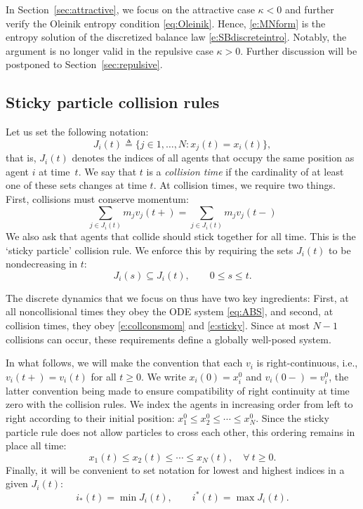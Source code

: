 \documentclass[11pt,reqno]{amsart}
\theoremstyle{definition}
\theoremstyle{remark}
\begin{document}
	In Section~\ref{sec:attractive}, we focus on the attractive case $\kappa<0$ and further verify the Oleinik entropy condition \eqref{eq:Oleinik}. Hence, \eqref{e:MNform} is the entropy solution of the discretized balance law \eqref{e:SBdiscreteintro}. 
	Notably, the argument is no longer valid in the repulsive case $\kappa>0$. Further discussion will be postponed to Section~\ref{sec:repulsive}.
	

	
	
	\subsection{Sticky particle collision rules}
	\label{sec:sticky}
	

	Let us set the following notation:
	\[ 
	J_i(t)\triangleq\big\{j\in 1, \ldots, N:x_j(t) = x_i(t)\big\}, 
	\]
	that is, $J_i(t)$ denotes the indices of all agents that occupy the same position as agent $i$ at time~$t$.  We say that $t$ is a \textit{collision time} if the cardinality of at least one of these sets changes at time $t$.  At collision times, we require two things.  First, collisions must conserve momentum:
	\begin{equation}
		\label{e:collconsmom}
		\sum_{j\in J_i(t)} m_j v_j(t+) = \sum_{j\in J_i(t)} m_j v_j(t-)
	\end{equation}
	We also ask that agents that collide should stick together for all time.  This is the `sticky particle' collision rule.  We enforce this by requiring the sets $J_i(t)$ to be nondecreasing in $t$:
	\begin{equation}
		\label{e:sticky}
		J_i(s)\subseteq J_i(t),\qquad 0\le s\le t.    
	\end{equation}
	
	
	The discrete dynamics that we focus on thus have two key ingredients: First, at all noncollisional times they obey the ODE system \eqref{eq:ABS}, and second, at collision times, they obey \eqref{e:collconsmom} and \eqref{e:sticky}.  Since at most $N-1$ collisions can occur, these requirements define a globally well-posed system.
	
	In what follows, we will make the convention that each $v_i$ is right-continuous, i.e., $v_i(t+) = v_i(t)$ for all $t\ge 0$.  We write $x_i(0) = x_i^0$ and $v_i(0-) = v_i^0$, the latter convention being made to ensure compatibility of right continuity at time zero with the collision rules.  We index the agents in increasing order from left to right according to their initial position: $x_1^0\le x_2^0\le \cdots \le x_N^0$. Since the sticky particle rule does not allow particles to cross each other, this ordering remains in place all time:
	\begin{equation}\label{eq:order}	
		x_1(t)\le x_2(t)\le \cdots \le x_N(t),\quad \forall~t\geq0.
	\end{equation}
	Finally, it will be convenient to set notation for lowest and highest indices in a given $J_i(t)$:
	\[
	i_*(t) = \min J_i(t), 
	\qquad 
	i^*(t) = \max J_i(t).
	\] 
	
\end{document}
